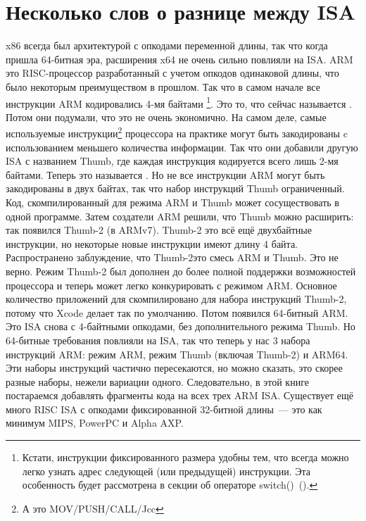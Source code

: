 \section{Несколько слов о разнице между \ac{ISA}}
x86 всегда был архитектурой с опкодами переменной длины, так что когда пришла 64-битная эра, расширения x64 не очень сильно повлияли на \ac{ISA}.
ARM это \ac{RISC}-процессор разработанный с учетом опкодов одинаковой длины, что было некоторым преимуществом в прошлом.
Так что в самом начале все инструкции ARM кодировались 4-мя байтами%
\footnote{
Кстати, инструкции фиксированного размера удобны тем, что всегда можно легко узнать адрес 
следующей (или предыдущей) инструкции. Эта особенность будет рассмотрена в секции об операторе switch()~().
}.
Это то, что сейчас называется .
Потом они подумали, что это не очень экономично.
На самом деле, самые используемые инструкции\footnote{А это MOV/PUSH/CALL/Jcc} процессора на практике могут быть закодированы c использованием меньшего количества информации.
Так что они добавили другую \ac{ISA} с названием Thumb, где каждая инструкция кодируется всего лишь 2-мя байтами.
Теперь это называется .
Но не все инструкции ARM могут быть закодированы в двух байтах, так что набор инструкций Thumb ограниченный.
Код, скомпилированный для режима ARM и Thumb может сосуществовать в одной программе.
Затем создатели ARM решили, что Thumb можно расширить: так появился Thumb-2 (в ARMv7).
Thumb-2 это всё ещё двухбайтные инструкции, но некоторые новые инструкции имеют длину 4 байта.
Распространено заблуждение, что Thumb-2\EMDASH{}это смесь ARM и Thumb. Это не верно. Режим Thumb-2 был дополнен до
более полной поддержки возможностей процессора и теперь может легко конкурировать с режимом ARM.
Основное количество приложений для \idevices скомпилировано для набора инструкций Thumb-2, потому что Xcode
делает так по умолчанию.
Потом появился 64-битный ARM. Это \ac{ISA} снова с 4-байтными опкодами, без дополнительного режима Thumb.
Но 64-битные требования повлияли на \ac{ISA}, так что теперь у нас 3 набора инструкций ARM: режим ARM, режим Thumb (включая Thumb-2) и ARM64.
Эти наборы инструкций частично пересекаются, но можно сказать, это скорее разные наборы, нежели вариации одного.
Следовательно, в этой книге постараемся добавлять фрагменты кода на всех трех ARM \ac{ISA}.
%
%
%
Существует ещё много \ac{RISC} \ac{ISA} с опкодами фиксированной 32-битной длины~--- это как минимум MIPS, PowerPC и Alpha AXP.
\fi %
\fi %

